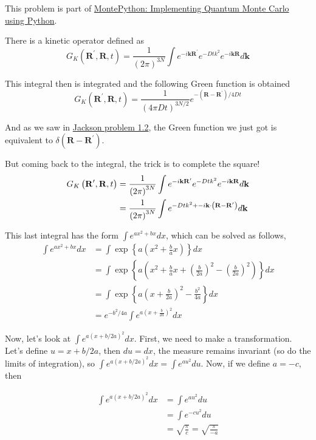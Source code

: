 This problem is part of
\href{https://arxiv.org/abs/physics/0609191}{MontePython: Implementing Quantum Monte Carlo using Python}.

There is a kinetic operator defined as
$$
G_K \left(\mathbf{R}^\prime, \mathbf{R}, t\right) =
\frac{1}{\left(2\pi\right)^{3N}} \int e^{-i\mathbf{k}\mathbf{R}^\prime} e^{-Dtk^2} e^{-i\mathbf{k}\mathbf{R}} d\mathbf{k}
$$

This integral then is integrated and the following Green function is obtained
$$
G_K \left(\mathbf{R}^\prime, \mathbf{R}, t\right) =
\frac{1}{\left(4\pi Dt\right)^{3N/2}} e^{-\left(\mathbf{R}-\mathbf{R}^\prime\right) / 4Dt}
$$

And as we saw in \hyperref[jackson:problem-1.2]{Jackson problem 1.2}, the Green function we just got is equivalent to
$\delta\left(\mathbf{R} - \mathbf{R}^\prime\right)$.

But coming back to the integral, the trick is to complete the square!
\begin{align*}
G_K \left(\boldsymbol{\mathbf{R}}^\prime, \boldsymbol{\mathbf{R}}, t\right) &=
\frac{1}{\left(2\pi\right)^{3N}} \int e^{-i\boldsymbol{\mathbf{k}}\boldsymbol{\mathbf{R}}^\prime} e^{-Dtk^2} e^{-i\boldsymbol{\mathbf{k}}\boldsymbol{\mathbf{R}}} d\boldsymbol{\mathbf{k}} \\
&= \frac{1}{\left(2\pi\right)^{3N}} \int e^{-Dtk^2 + -i\boldsymbol{\mathbf{k}}\cdot\left(\boldsymbol{\mathbf{R}}-\boldsymbol{\mathbf{R}}^\prime\right)} d\mathbf{k}
\end{align*}

This last integral has the form $\int e^{ax^2 + bx} dx$, which can be solved as follows,
\begin{align*}
\int e^{ax^2 + bx} dx &= \int \exp\left\{ a\left(x^2 + \frac{b}{a}x\right) \right\} dx \\
&= \int \exp\left\{ a\left(x^2 + \frac{b}{a}x + \left(\frac{b}{2a}\right)^2 - \left(\frac{b}{2a}\right)^2 \right) \right\} dx \\
&= \int \exp\left\{ a\left(x + \frac{b}{2a}\right)^2 - \frac{b^2}{4a} \right\} dx \\
&= e^{-b^2/4a} \int e^{ a\left(x + \frac{b}{2a}\right)^2 } dx
\end{align*}

Now, let's look at $\int e^{ a\left(x + b/2a\right)^2 } dx$.
First, we need to make a transformation.
Let's define $u = x + b/2a$, then $du = dx$, the measure remains invariant (so do the limits of integration), so
$\int e^{ a\left(x + b/2a\right)^2 } dx = \int e^{ au^2 } du$.
Now, if we define $a = -c$, then 

\begin{align*}
\int e^{ a\left(x + b/2a\right)^2 } dx &= \int e^{ au^2 } du \\
&= \int e^{ -cu^2 } du \\
&= \sqrt{ \frac{\pi}{c} } = \sqrt{ \frac{\pi}{-a} } 
\end{align*}

